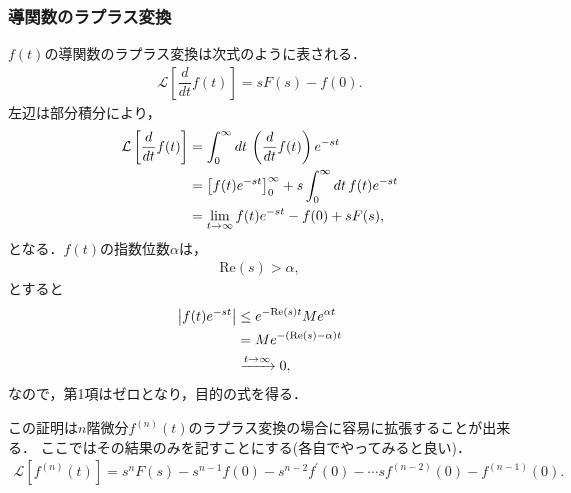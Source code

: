 \subsubsection{導関数のラプラス変換}
%
$f(t)$の導関数のラプラス変換は次式のように表される．
\begin{align}
  \mathcal{L}\left[\dfrac{d}{dt}f(t)\right] = sF(s) - f(0). 
\end{align}
%
左辺は部分積分により，
\begin{align}
 \mathcal{L}\left[\dfrac{d}{dt}f(t)\right]
 & = \int_{0}^{\infty}dt\, \left(\dfrac{d}{dt}f(t)\right)e^{-st} \notag \\
 & = \left[f(t)e^{-st}\right]_{0}^{\infty} +s \int_{0}^{\infty}dt\, f(t)e^{-st} \notag \\
 & = \lim_{t\to \infty}f(t)e^{-st} - f(0) + sF(s), 
\end{align}
となる．$f(t)$の指数位数$\alpha$は，
\begin{align}
  \mathrm{Re}(s) > \alpha, 
\end{align}
とすると
\begin{align}
  \left|f(t)e^{-st}\right| 
  &\leq e^{-\mathrm{Re}(s)t}Me^{\alpha t} \notag \\
  & = M e^{-(\mathrm{Re}(s)-\alpha)t} \notag \\
  & \xrightarrow{t\to \infty} 0, 
\end{align}
なので，第1項はゼロとなり，目的の式を得る．
%

この証明は$n$階微分$f^{(n)}(t)$のラプラス変換の場合に容易に拡張することが出来る．
ここではその結果のみを記すことにする(各自でやってみると良い)．
\begin{align}
 \mathcal{L}\left[f^{(n)}(t)\right] = s^n F(s) - s^{n-1}f(0) - s^{n-2}f^{\prime}(0) - \cdots sf^{(n-2)}(0)-f^{(n-1)}(0). 
\end{align}
%
